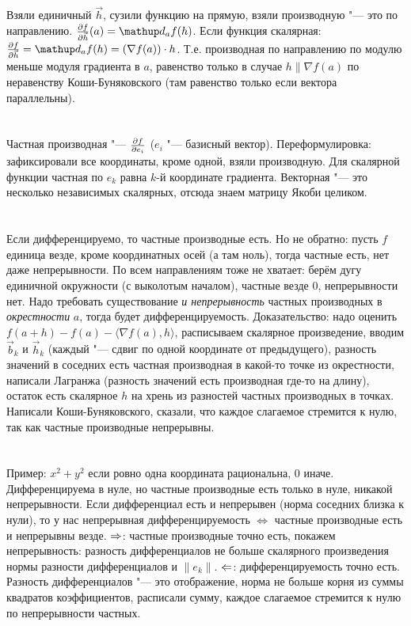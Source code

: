 \section{} %
Взяли единичный $\vec h$, сузили функцию на прямую, взяли производную "--- это по направлению.
$\partd{f}{\vec h} (a) = \d_af(h)$.
Если функция скалярная: $\partd{f}{\vec h} = \d_af(h) = (\nabla f(a)) \cdot h$.
Т.е. производная по направлению по модулю меньше модуля градиента в $a$, равенство только в случае $h \parallel \nabla f(a)$ по неравенству Коши-Буняковского (там равенство только если вектора параллельны).

\section{} %
Частная производная "--- $\frac{\partial f}{\partial e_i}$ ($e_i$ "--- базисный вектор).
Переформулировка: зафиксировали все координаты, кроме одной, взяли производную.
Для скалярной функции частная по $e_k$ равна $k$-й координате градиента.
Векторная "--- это несколько независимых скалярных, отсюда знаем матрицу Якоби целиком.

\section{} %
Если дифференцируемо, то частные производные есть.
Но не обратно: пусть $f$ единица везде, кроме координатных осей (а там ноль), тогда частные есть, нет даже непрерывности.
По всем направлениям тоже не хватает: берём дугу единичной окружности (с выколотым началом), частные везде 0, непрерывности нет.
Надо требовать существование \textit{и непрерывность} частных производных в \textit{окрестности} $a$, тогда будет дифференцируемость.
Доказательство: надо оценить $f(a+h)-f(a)-\langle \nabla f(a), h\rangle$, расписываем скалярное произведение,
вводим $\vec b_k$ и $\vec h_k$ (каждый "--- сдвиг по одной координате от предыдущего), разность значений в соседних есть частная производная
в какой-то точке из окрестности, написали Лагранжа (разность значений есть производная где-то на длину), остаток есть скалярное $h$ на хрень из разностей частных производных в точках.
Написали Коши-Буняковского, сказали, что каждое слагаемое стремится к нулю, так как частные производные непрерывны.

\section{} %
Пример: $x^2+y^2$ если ровно одна координата рациональна, $0$ иначе.
Дифференцируема в нуле, но частные производные есть только в нуле, никакой непрерывности.
Если дифференциал есть и непрерывен (норма соседних близка к нули), то у нас непрерывная дифференцируемость $\iff$ частные производные есть и непрерывны везде.
$\Rightarrow$: частные производные точно есть, покажем непрерывность: разность дифференциалов не больше скалярного произведения нормы разности дифференциалов и $\|e_k\|$.
$\Leftarrow$: дифференцируемость точно есть.
Разность дифференциалов "--- это отображение, норма не больше корня из суммы квадратов коэффициентов, расписали сумму, каждое слагаемое стремится к нулю по непрерывности частных.


